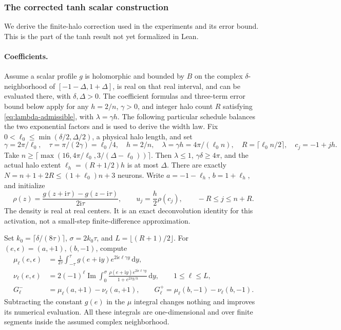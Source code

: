 \documentclass[11pt,letterpaper]{article}
\newcommand{\dd}{\,\mathrm d}
\newcommand{\ii}{\mathrm i}
\theoremstyle{definition}
\theoremstyle{remark}
\begin{document}
\subsubsection{The corrected tanh scalar construction}\label{sec:corrected-tanh}
We derive the finite-halo correction used in the experiments and its error
bound. This is the part of the tanh result not yet formalized in Lean.

\paragraph{Coefficients.}
Assume a scalar profile \(g\) is holomorphic and bounded by \(B\) on the
complex \(\delta\)-neighborhood of \([-1-\Delta,1+\Delta]\), is real on
that real interval, and can be evaluated there, with \(\delta,\Delta>0\).
The coefficient formulas and three-term error bound below apply for any
\(h=2/n\), \(\gamma>0\), and integer halo count \(R\) satisfying
\eqref{eq:lambda-admissible}, with \(\lambda=\gamma h\).
The following particular schedule balances the two exponential factors
and is used to derive the width law.
Fix \(0<\ell_0\le\min(\delta/2,\Delta/2)\), a physical halo length, and set
\[
 \gamma=2\pi/\ell_0,\quad \tau=\pi/(2\gamma)=\ell_0/4,\quad
 h=2/n,\quad\lambda=\gamma h=4\pi/(\ell_0 n),\quad
 R=\lceil \ell_0 n/2\rceil,\quad c_j=-1+jh.
\]
Take \(n\ge\lceil\max(16,4\pi/\ell_0,3/(\Delta-\ell_0))\rceil\).
Then \(\lambda\le1\), \(\gamma\delta\ge4\pi\), and the actual halo extent
\(\ell_h=(R+1/2)h\) is at most \(\Delta\).
There are exactly \(N=n+1+2R\le(1+\ell_0)n+3\) neurons.
Write \(a=-1-\ell_h\), \(b=1+\ell_h\), and initialize
\[
 \rho(z)=\frac{g(z+\ii\tau)-g(z-\ii\tau)}{2\ii\tau},
 \qquad u_j=\frac h2\rho(c_j),\qquad -R\le j\le n+R.
\]
The density is real at real centers. It is an exact deconvolution identity
for this activation, not a small-step finite-difference approximation.

Set \(k_0=\lceil\delta/(8\tau)\rceil\), \(\sigma=2k_0\tau\), and
\(L=\lfloor(R+1)/2\rfloor\). For \((e,\epsilon)=(a,+1),(b,-1)\), compute
\begin{align*}
 \mu_\ell(e,\epsilon)&=\frac1{2\tau}\int_{-\tau}^{\tau}
       g(e+\ii y)e^{2\ii\epsilon\ell\gamma y}\dd y,\\
 \nu_\ell(e,\epsilon)&=2(-1)^\ell\operatorname{Im}\int_0^\sigma
       \frac{\rho(e+\ii y)e^{2\ii\epsilon\ell\gamma y}}
       {1+e^{2\pi y/h}}\dd y,\qquad 1\le\ell\le L,\\
 G_\ell^-&=\mu_\ell(a,+1)-\nu_\ell(a,+1),\qquad
 G_\ell^+=\mu_\ell(b,-1)-\nu_\ell(b,-1).
\end{align*}
Subtracting the constant \(g(e)\) in the \(\mu\) integral changes nothing and
improves its numerical evaluation. All these integrals are one-dimensional
and over finite segments inside the assumed complex neighborhood.
\end{document}
